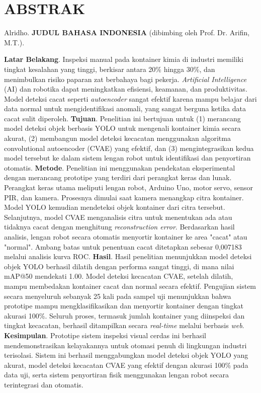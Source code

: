 \begingroup
\singlespacing
\chapter*{ABSTRAK}

\noindent
Alridho. \textbf{JUDUL BAHASA INDONESIA} (dibimbing oleh Prof. Dr. Arifin, M.T.). \par

\vspace*{0.1cm}

\noindent
\textbf{Latar Belakang}. Inspeksi manual pada kontainer kimia di industri memiliki tingkat kesalahan yang tinggi, berkisar antara 20\% hingga 30\%, dan menimbulkan risiko paparan zat berbahaya bagi pekerja. \textit{Artificial Intelligence} (AI) dan robotika dapat meningkatkan efisiensi, keamanan, dan produktivitas. Model deteksi cacat seperti \textit{autoencoder} sangat efektif karena mampu belajar dari data normal untuk mengidentifikasi anomali, yang sangat berguna ketika data cacat sulit diperoleh. \textbf{Tujuan}. Penelitian ini bertujuan untuk (1) merancang model deteksi objek berbasis YOLO untuk mengenali kontainer kimia secara akurat, (2) membangun model deteksi kecacatan menggunakan algoritma convolutional autoencoder (CVAE) yang efektif, dan (3) mengintegrasikan kedua model tersebut ke dalam sistem lengan robot untuk identifikasi dan penyortiran otomatis. \textbf{Metode}. Penelitian ini menggunakan pendekatan eksperimental dengan merancang prototipe yang terdiri dari perangkat keras dan lunak. Perangkat keras utama meliputi lengan robot, Arduino Uno, motor servo, sensor PIR, dan kamera. Prosesnya dimulai saat kamera menangkap citra kontainer. Model YOLO kemudian mendeteksi objek kontainer dari citra tersebut. Selanjutnya, model CVAE menganalisis citra untuk menentukan ada atau tidaknya cacat dengan menghitung \textit{reconstruction error}. Berdasarkan hasil analisis, lengan robot secara otomatis menyortir kontainer ke area "cacat" atau "normal". Ambang batas untuk penentuan cacat ditetapkan sebesar 0,007183 melalui analisis kurva ROC. \textbf{Hasil}. Hasil penelitian menunjukkan model deteksi objek YOLO berhasil dilatih dengan performa sangat tinggi, di mana nilai mAP@50 mendekati 1.00. Model deteksi kecacatan CVAE, setelah dilatih, mampu membedakan kontainer cacat dan normal secara efektif. Pengujian sistem secara menyeluruh sebanyak 25 kali pada sampel uji menunjukkan bahwa prototipe mampu mengklasifikasikan dan menyortir kontainer dengan tingkat akurasi 100\%. Seluruh proses, termasuk jumlah kontainer yang diinspeksi dan tingkat kecacatan, berhasil ditampilkan secara \textit{real-time} melalui berbasis \textit{web}. \textbf{Kesimpulan}. Prototipe sistem inspeksi visual cerdas ini berhasil mendemonstrasikan kelayakannya untuk otomasi penuh di lingkungan industri terisolasi. Sistem ini berhasil menggabungkan model deteksi objek YOLO yang akurat, model deteksi kecacatan CVAE yang efektif dengan akurasi 100\% pada data uji, serta sistem penyortiran fisik menggunakan lengan robot secara terintegrasi dan otomatis. \par 


